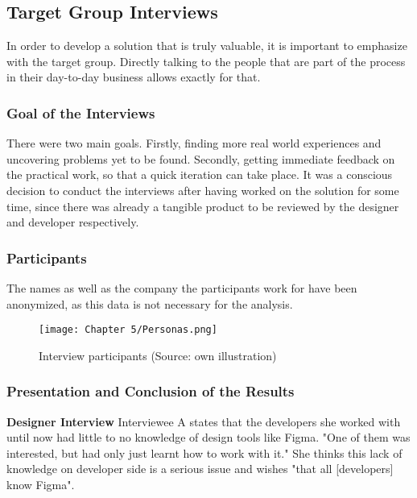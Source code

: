 \newpage
\subsection{Target Group Interviews}
In order to develop a solution that is truly valuable, it is important to emphasize with the target
group. Directly talking to the people that are part of the process in their day-to-day business
allows exactly for that.

\subsubsection{Goal of the Interviews}
There were two main goals. Firstly, finding more real world experiences and uncovering problems yet
to be found. Secondly, getting immediate feedback on the practical work, so that a quick iteration
can take place. It was a conscious decision to conduct the interviews after having worked on the
solution for some time, since there was already a tangible product to be reviewed by the designer
and developer respectively.

\subsubsection{Participants}
The names as well as the company the participants work for have been anonymized, as this data is not
necessary for the analysis. 
\begin{figure}[H]
    \centering
    \texttt{[image: Chapter 5/Personas.png]}
    \caption{Interview participants (Source: own illustration)}
\end{figure}


\subsubsection{Presentation and Conclusion of the Results}
\textbf{Designer Interview}
Interviewee A states that the developers she worked with until now had little to no knowledge of
design tools like Figma.  "One of them was
interested, but had only just learnt how to work with it."
 She thinks this lack of knowledge on
developer side is a serious issue and wishes "that all [developers] know Figma".

